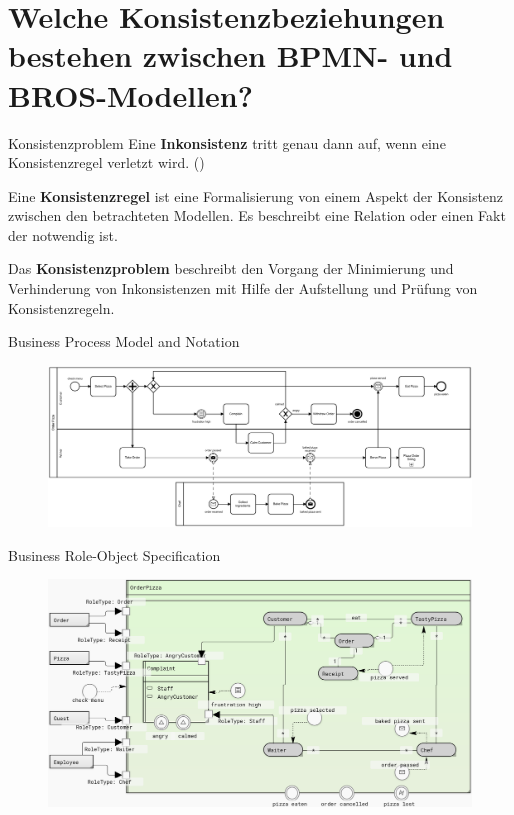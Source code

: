 \section{Welche Konsistenzbeziehungen bestehen zwischen BPMN- und BROS-Modellen?}

\begin{frame}{Konsistenzproblem}
  Eine \textbf{Inkonsistenz} tritt genau dann auf, wenn eine Konsistenzregel verletzt wird. (\cite{Nuseibeh1996})

  Eine \textbf{Konsistenzregel} ist eine Formalisierung von einem Aspekt der Konsistenz zwischen den betrachteten Modellen. Es beschreibt eine Relation oder einen Fakt der notwendig ist.

  Das \textbf{Konsistenzproblem} beschreibt den Vorgang der Minimierung und Verhinderung von Inkonsistenzen mit Hilfe der Aufstellung und Prüfung von Konsistenzregeln.
\end{frame}

\begin{frame}{Business Process Model and Notation}
  \begin{figure}
    \centering
    \begin{adjustbox}{width=1.1\linewidth,center}
      \includegraphics{images/example/bpmn.pdf}
    \end{adjustbox}
  \end{figure}
\end{frame}
\begin{frame}{Business Role-Object Specification}
  \begin{figure}
    \centering
    \begin{adjustbox}{width=0.9\linewidth,center}
      \includegraphics{images/example/bros-rule6.png}
    \end{adjustbox}
  \end{figure}
\end{frame}

